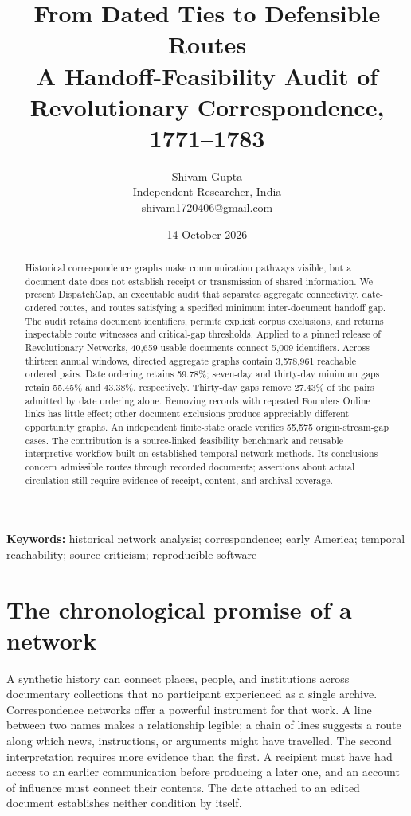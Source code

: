 \documentclass[11pt]{article}
\title{\textbf{From Dated Ties to Defensible Routes}\\[4pt]\large A Handoff-Feasibility Audit of Revolutionary Correspondence, 1771--1783}
\author{Shivam Gupta\\\small Independent Researcher, India\\\small\href{mailto:shivam1720406@gmail.com}{shivam1720406@gmail.com}}
\date{14 October 2026}
\begin{document}
\maketitle
\begin{abstract}
Historical correspondence graphs make communication pathways visible, but a document date does not establish receipt or transmission of shared information. We present DispatchGap, an executable audit that separates aggregate connectivity, date-ordered routes, and routes satisfying a specified minimum inter-document handoff gap. The audit retains document identifiers, permits explicit corpus exclusions, and returns inspectable route witnesses and critical-gap thresholds. Applied to a pinned release of Revolutionary Networks, 40,659 usable documents connect 5,009 identifiers. Across thirteen annual windows, directed aggregate graphs contain 3,578,961 reachable ordered pairs. Date ordering retains 59.78\%; seven-day and thirty-day minimum gaps retain 55.45\% and 43.38\%, respectively. Thirty-day gaps remove 27.43\% of the pairs admitted by date ordering alone. Removing records with repeated Founders Online links has little effect; other document exclusions produce appreciably different opportunity graphs. An independent finite-state oracle verifies 55,575 origin-stream-gap cases. The contribution is a source-linked feasibility benchmark and reusable interpretive workflow built on established temporal-network methods. Its conclusions concern admissible routes through recorded documents; assertions about actual circulation still require evidence of receipt, content, and archival coverage.
\end{abstract}
\noindent\textbf{Keywords:} historical network analysis; correspondence; early America; temporal reachability; source criticism; reproducible software

\section{The chronological promise of a network}
A synthetic history can connect places, people, and institutions across documentary collections that no participant experienced as a single archive. Correspondence networks offer a powerful instrument for that work. A line between two names makes a relationship legible; a chain of lines suggests a route along which news, instructions, or arguments might have travelled. The second interpretation requires more evidence than the first. A recipient must have had access to an earlier communication before producing a later one, and an account of influence must connect their contents. The date attached to an edited document establishes neither condition by itself.
\end{document}
